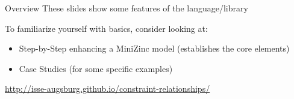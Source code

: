 \documentclass[10pt,xcolor={dvipsnames},fleqn]{beamer}
\newcommand{\cemph}[1]{\alert{#1}}
\begin{document}
%
%
%
%

\begin{frame}{Overview}
These slides show some features of the language/library


\vspace*{2ex}

To familiarize yourself with basics, consider looking at:
\begin{itemize}
\item Step-by-Step enhancing a MiniZinc model (establishes the core elements)
\item Case Studies (for some specific examples)
\end{itemize}

\vspace*{2ex}

\url{http://isse-augsburg.github.io/constraint-relationships/}
\end{frame}
\end{document}
